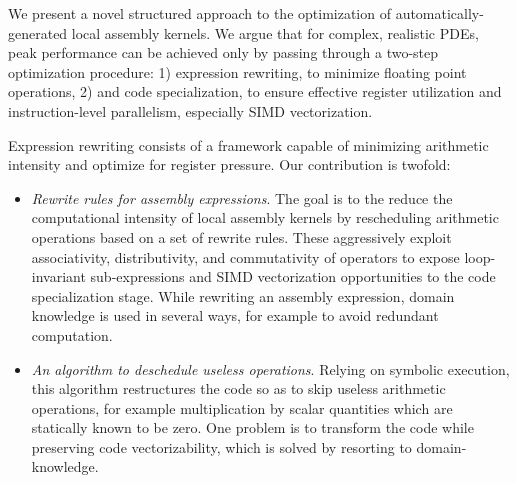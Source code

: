 We present a novel structured approach to the optimization of automatically-generated local assembly kernels. We argue that for complex, realistic PDEs, peak performance can be achieved only by passing through a two-step optimization procedure: 1) expression rewriting, to minimize floating point operations, 2) and code specialization, to ensure effective register utilization and instruction-level parallelism, especially SIMD vectorization. 

Expression rewriting consists of a framework capable of minimizing arithmetic intensity and optimize for register pressure. Our contribution is twofold:
\begin{itemize}
\item \emph{Rewrite rules for assembly expressions}. The goal is to the reduce the computational intensity of local assembly kernels by rescheduling arithmetic operations based on a set of rewrite rules. These aggressively exploit associativity, distributivity, and commutativity of operators to expose loop-invariant sub-expressions and SIMD vectorization opportunities to the code specialization stage. While rewriting an assembly expression, domain knowledge is used in several ways, for example to avoid redundant computation.
\item \emph{An algorithm to deschedule useless operations}. Relying on symbolic execution, this algorithm restructures the code so as to skip useless arithmetic operations, for example multiplication by scalar quantities which are statically known to be zero. One problem is to transform the code while preserving code vectorizability, which is solved by resorting to domain-knowledge. 
\end{itemize}

